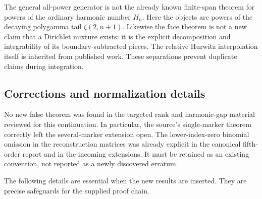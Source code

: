 The general all-power generator is not the already known finite-span
theorem for powers of the ordinary harmonic number $H_n$. Here the
objects are powers of the decaying polygamma tail $\zeta(2,n+1)$.
Likewise the face theorem is not a new claim that a Dirichlet mixture
exists: it is the explicit decomposition and integrability of its
boundary-subtracted pieces. The relative Hurwitz interpolation itself
is inherited from published work. These separations prevent duplicate
claims during integration.

\subsection{Corrections and normalization details}

No new false theorem was found in the targeted rank and harmonic-gap
material reviewed for this continuation. In particular, the source's
single-marker theorem correctly left the several-marker extension open.
The lower-index-zero binomial omission in the reconstruction matrices
was already explicit in the canonical fifth-order report and in the
incoming extensions. It must be retained as an existing convention,
not reported as a newly discovered erratum.

The following details are essential when the new results are inserted.
They are precise safeguards for the supplied proof chain.

